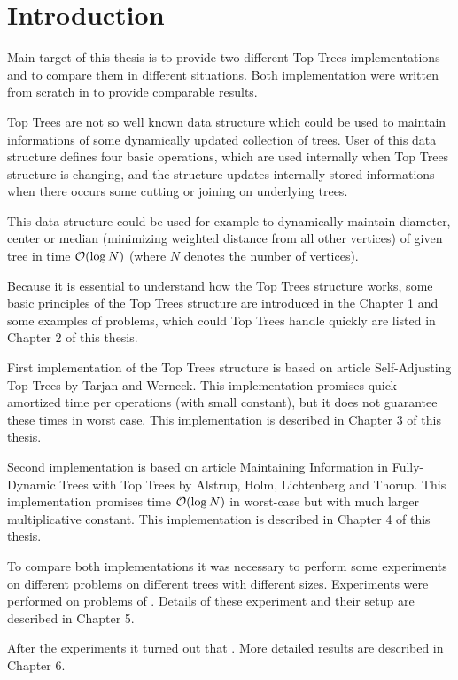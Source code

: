 \chapter*{Introduction}

Main target of this thesis is to provide two different {\I Top Trees}
implementations and to compare them in different situations. Both implementation
were written from scratch in \Cpp{} to provide comparable results.

{\I Top Trees} are not so well known data structure which could be used to
maintain informations of some dynamically updated collection of trees. User of
this data structure defines four basic operations, which are used internally
when Top Trees structure is changing, and the structure updates internally
stored informations when there occurs some cutting or joining on underlying
trees.

This data structure could be used for example to dynamically maintain diameter,
center or median (minimizing weighted distance from all other vertices) of given
tree in time ${\cal O}(\log N)$ (where $N$ denotes the number of vertices).

Because it is essential to understand how the Top Trees structure works, some
basic principles of the Top Trees structure are introduced in the Chapter 1
and some examples of problems, which could Top Trees handle quickly are listed
in Chapter 2 of this thesis.

First implementation of the Top Trees structure is based on article {\I
Self-Adjusting Top Trees} \cite{SelfAdjustingTT} by Tarjan and Werneck. This
implementation promises quick amortized time per operations (with small
constant), but it does not guarantee these times in worst case. This
implementation is described in Chapter 3 of this thesis.

Second implementation is based on article {\I Maintaining Information in
Fully-Dynamic Trees with Top Trees} \cite{TopTrees} by Alstrup, Holm,
Lichtenberg and Thorup. This implementation promises time ${\cal O}(\log N)$ in
worst-case but with much larger multiplicative constant. This implementation is
described in Chapter 4 of this thesis.

To compare both implementations it was necessary to perform some experiments on
different problems on different trees with different sizes. Experiments were
performed on problems of . Details of these experiment
and their setup are described in Chapter 5.

After the experiments it turned out that
.
More detailed results are described in Chapter 6.
